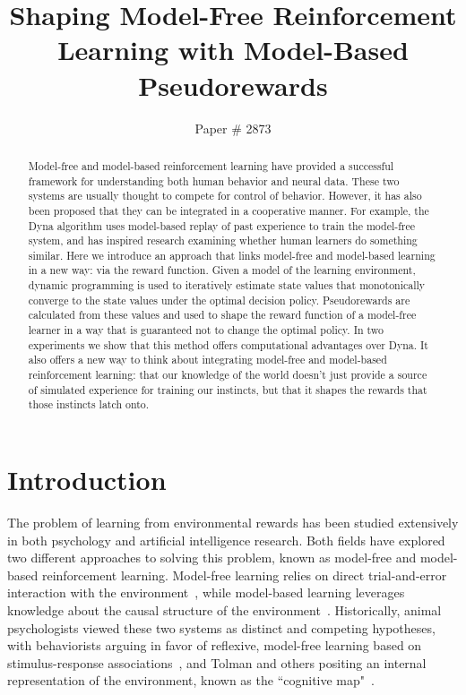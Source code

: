 \documentclass[letterpaper]{article}
\begin{document}
%

\title{Shaping Model-Free Reinforcement Learning with Model-Based Pseudorewards}
\author{  Paper \# 2873}
\date{}
\maketitle
\begin{abstract}
Model-free and model-based reinforcement learning have provided a successful framework for understanding both human behavior and neural data. These two systems are usually thought to compete for control of behavior. However, it has also been proposed that they can be integrated in a cooperative manner. For example, the Dyna algorithm uses model-based replay of past experience to train the model-free system, and has inspired research examining whether human learners do something similar. Here we introduce an approach that links model-free and model-based learning in a new way: via the reward function. Given a model of the learning environment, dynamic programming is used to iteratively estimate state values that monotonically converge to the state values under the optimal decision policy. Pseudorewards are calculated from these values and used to shape the reward function of a model-free learner in a way that is guaranteed not to change the optimal policy. In two experiments we show that this method offers computational advantages over Dyna. It also offers a new way to think about integrating model-free and model-based reinforcement learning: that our knowledge of the world doesn't just provide a source of simulated experience for training our instincts, but that it shapes the rewards that those instincts latch onto.
\end{abstract}

\section{Introduction}

The problem of learning from environmental rewards has been studied extensively in both psychology and artificial intelligence research. Both fields have explored two different approaches to solving this problem, known as model-free and model-based reinforcement learning. Model-free learning relies on direct trial-and-error interaction with the environment~\cite{sutton1992reinforcement}, while model-based learning leverages knowledge about the causal structure of the environment~\cite{barto1995learning}. Historically, animal psychologists viewed these two systems as distinct and competing hypotheses, with behaviorists arguing in favor of reflexive, model-free learning based on stimulus-response associations~\cite{thorndike1933proof}, and Tolman and others positing an internal representation of the environment, known as the ``cognitive map"~\cite{tolman1948cognitive}.
\end{document}
